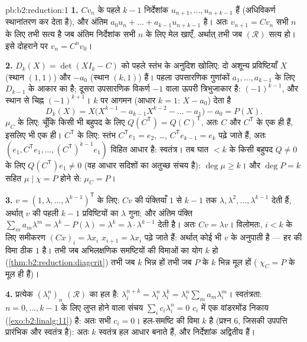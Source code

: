\begin{solution}{pb:b2:reduction:1}
\textbf{1.} $Cv_n$ के पहले $k - 1$ निर्देशांक $u_{n+1},
\dots, u_{n+k-1}$ हैं (अधिविकर्ण
स्थानांतरण कर देता है), और अंतिम $a_0 u_n + \dots + a_{k-1}u_{n+k-1}$ है। अतः $v_{n+1} = Cv_n$ सभी $n$ के लिए तभी
सत्य है जब अंतिम निर्देशांक सभी $n$ के लिए मेल खाएँ, अर्थात् तभी जब
$(\mathcal R)$ सत्य हो। इसे दोहराने पर $v_n = C^nv_0$।

\textbf{2.} $D_k(X) = \det(XI_k - C)$ को पहले स्तंभ के अनुदिश खोलिए: दो अशून्य प्रविष्टियाँ
$X$ (स्थान $(1,1)$) और $-a_0$ (स्थान $(k,1)$) हैं। पहला उपसारणिक गुणांकों $a_1, \dots, a_{k-1}$ के
लिए $D_{k-1}$ के आकार का है; दूसरा उपसारणिक विकर्ण $-1$ वाला ऊपरी
त्रिभुजाकार है:  $(-1)^{k-1}$, और स्थान से चिह्न $(-1)^{k+1}$। $k$ पर आगमन (आधार
$k = 1$: $X - a_0$) देता है
\[
D_k(X) = X\bigl(X^{k-1} - a_{k-1}X^{k-2} - \dots - a_1\bigr) -
a_0 = P(X).
\]
$\mu_C$ के लिए: चूँकि किसी भी बहुपद के लिए $Q(C^{\mathsf T}) = Q(C)^{\mathsf T}$, अतः $C$ और $C^{\mathsf T}$ के
 एक ही हैं, इसलिए  भी एक ही। $C^{\mathsf T}$ के लिए: स्तंभ
$C^{\mathsf T}e_1 = e_2$, \dots, $C^{\mathsf
T}e_{k-1} = e_k$ पढ़े जाते हैं, अतः $(e_1, C^{\mathsf T}e_1, \dots, (C^{\mathsf
T})^{k-1}e_1)$ विहित आधार है: स्वतंत्र।
तब घात $< k$ के किसी बहुपद $Q
\neq 0$ के लिए $Q(C^{\mathsf T})e_1 \neq 0$ (वह आधार सदिशों का अतुच्छ
संचय है): $\deg\mu \geq
k$। और $\deg P = k$ सहित $\mu \mid \chi = P$ होने से: $\mu_C = P$।

\textbf{3.} $v = (1, \lambda, \dots, \lambda^{k-1})^{\mathsf
T}$ के लिए: $Cv$ की पंक्तियाँ $1$ से $k-1$ तक $\lambda, \lambda^2, \dots,
\lambda^{k-1}$ देती हैं,
अर्थात् $v$ की पहली $k - 1$ प्रविष्टियों का $\lambda$ गुना; और अंतिम पंक्ति $\sum_m a_m\lambda^m = \lambda^k -
P(\lambda) = \lambda^k = \lambda\cdot\lambda^{k-1}$
देती है। अतः $Cv =
\lambda v$। विलोमतः, $i < k$ के लिए समीकरण $(Cx)_i = \lambda x_i$ $x_{i+1} = \lambda x_i$ पढ़े जाते हैं:
अर्थात् कोई भी  $v$ के अनुपाती है --- हर  की विमा ठीक $1$ है।  तभी जब अभिलक्षणिक समष्टियों की
विमाओं का योग $k$ हो (\cref{thm:b2:reduction:diagcrit}) तभी जब $k$ भिन्न  हों तभी
जब $P$ के $k$ भिन्न मूल हों ( $\chi_C = P$ के मूल ही हैं)।

\textbf{4.} प्रत्येक $(\lambda_i^n)_n$ $(\mathcal R)$ का हल है: $\lambda_i^{n+k} = \lambda_i^n\,\lambda_i^k =
\lambda_i^n\sum_m a_m\lambda_i^m$। स्वतंत्रता: $n = 0, \dots, k-1$ के लिए
लुप्त होने वाला संचय $\sum_i c_i\lambda_i^n = 0$ $c_i$ में एक वांडरमोंड निकाय (\cref{exo:b2:linalg:11}) है: अतः सभी
$c_i = 0$। हल-समष्टि की विमा $k$ है (प्रश्न 6, जिसकी उपपत्ति प्रारंभिक और
स्वतंत्र है): अतः $k$ स्वतंत्र हल आधार बनाते हैं, और निर्देशांक
अद्वितीय हैं।


\end{solution}
